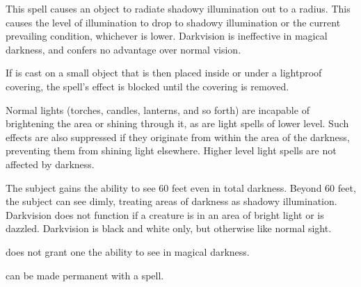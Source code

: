 \spellrng{\rngtouch}
\begin{spelleffect}
  This spell causes an object to radiate shadowy illumination out to a \areamed radius. This causes the level of illumination to drop to shadowy illumination or the current prevailing condition, whichever is lower. Darkvision is ineffective in magical darkness, and confers no advantage over normal vision.
\end{spelleffect}
\begin{spellnotes}
  If  is cast on a small object that is then placed inside or under a lightproof covering, the spell's effect is blocked until the covering is removed.

  Normal lights (torches, candles, lanterns, and so forth) are incapable of brightening the area or shining through it, as are light spells of lower level. Such effects are also suppressed if they originate from within the area of the darkness, preventing them from shining light elsewhere. Higher level light spells are not affected by darkness.
\end{spellnotes}

\spellrng{\rngtouch}
\spelldur{\durlong}
\begin{spelleffect}
  The subject gains the ability to see 60 feet even in total darkness. Beyond 60 feet, the subject can see dimly, treating areas of darkness as shadowy illumination. Darkvision does not function if a creature is in an area of bright light or is dazzled. Darkvision is black and white only, but otherwise like normal sight.
\end{spelleffect}
\begin{spellnotes}
   does not grant one the ability to see in magical darkness.

  \par {} can be made permanent with a  spell.
\end{spellnotes}

